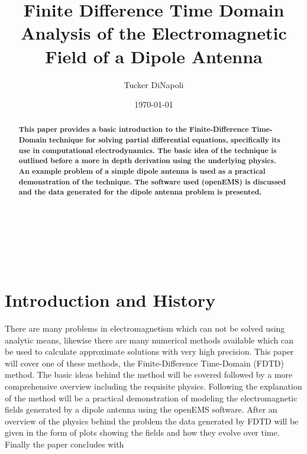 \documentclass[twocolumn]{article}
\title{Finite Difference Time Domain Analysis of the Electromagnetic Field of a Dipole Antenna}
\author{Tucker DiNapoli}
\date{\today}
\begin{document}
\maketitle
\begin{abstract}
\textbf{This paper provides a basic introduction to the Finite-Difference Time-Domain technique for solving
partial differential equations, specifically its use in computational electrodynamics. The basic idea
of the technique is outlined before a more in depth derivation using the underlying physics. An
example problem of a simple dipole antenna is used as a practical demonstration of the
technique. The software used (openEMS) is discussed and the data generated for the dipole antenna
problem is presented.}
\end{abstract}
\\ \\ \\
\def\thesection{\Roman{section}.}
\section{Introduction and History}

There are many problems in electromagnetism which can not be solved using analytic means, likewise
there are many numerical methods available which can be used to calculate approximate solutions with
very high precision. This paper will cover one of these methods, the Finite-Difference Time-Domain
(FDTD) method. The basic ideas behind the method will be covered followed by a more comprehensive
overview including the requisite physics. Following the explanation of the method will be a
practical demonstration of modeling the electromagnetic fields generated by a dipole antenna using
the openEMS software\cite{openEMS}. After an overview of the physics behind the problem the data
generated by FDTD will be given in the form of plots showing the fields and how they evolve over
time. Finally the paper concludes with %
\end{document}
